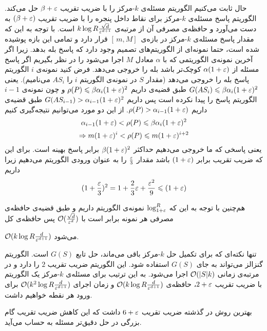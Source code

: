 حال ثابت می‌کنیم الگوریتم  مسئله‌ی $k$-مرکز را با ضریب تقریب $ \beta + \varepsilon$ حل می‌کند.
الگوریتم   پاسخ مسئله‌ی $k$-مرکز برای نقاط داخل پنجره را با ضریب تقریب $(\beta+\varepsilon)$ به دست می‌آورد و حافظه‌ی مصرفی آن از مرتبه‌ی 
$ k \log R \frac{\sqrt{d}}{\varepsilon^{d+1}}$
است.
با توجه به این که مقدار پاسخ مسئله‌ی $k$-مرکز در بازه‌ی $ [\, m, M]\,$ قرار دارد و تمامی این بازه پوشیده شده است، حتما نمونه‌ای از الگوریتم‌های تصمیم وجود دارد که پاسخ بله بدهد. زیرا اگر آخرین نمونه‌ی الگوریتمی که با $\alpha$ معادل $M$ اجرا می‌شود را در نظر بگیریم اگر پاسخ مسئله از 
$\alpha (1 +\varepsilon)$
کوچک‌تر باشد بله را خروجی می‌دهد. فرض کنید نمونه‌ی $i$ الگوریتم پاسخ بله را خروجی می‌دهد (مقدار $S$ در نمونه‌ی الگوریتم $i$ را $AS_i$ می‌نامیم). یعنی
$ G(AS_i) \leqslant \beta \alpha_i (1 + \varepsilon) ^ 2 $
طبق قضیه‌ی  داریم
$ \rho(P) \leqslant \beta \alpha_i (1 + \varepsilon) ^ 2 $
و چون نمونه‌ی $i-1$ الگوریتم  پاسخ را پیدا نکرده است پس داریم
$ G(AS_{i-1}) > \alpha_{i-1} (1+\varepsilon)^2$
طبق قضیه‌ی  داریم
$ \rho(P) >  \alpha_{i-1} (1 + \varepsilon) $.
از این دو مورد می‌توانیم نتیجه‌گیری کنیم
$$   \alpha_{i-1} (1 + \varepsilon) < \rho(P) \leqslant  \beta \alpha_i (1 + \varepsilon) ^ 2  $$
$$ \Rightarrow m (1+\varepsilon)^i < \rho(P) \leqslant m (1+\varepsilon)^{i+2} $$
یعنی پاسخی که ما خروجی می‌دهیم حداکثر 
$\beta (1 + \varepsilon)^2$
برابر پاسخ بهینه است. برای این که ضریب تقریب برابر $(1+\varepsilon)$ باشد مقدار $\frac{\varepsilon}{3}$ را به عنوان ورودی الگوریتم می‌دهیم زیرا داریم
$$ (1+\frac{\varepsilon}{3})^2 = 1 + \frac{2}{3} \varepsilon + \frac{\varepsilon^2}{9} \leqslant (1+\varepsilon)$$

هم‌چنین با توجه به این که $\log_{1+\varepsilon}^{R} $ نمونه‌ی الگوریتم داریم و طبق قضیه‌ی  حافظه‌ی مصرفی هر نمونه برابر است با 
$\mathcal{O}(\frac{\sqrt{d}}{\varepsilon^d})$
پس حافظه‌ی کل

$ \mathcal{O}(k \log R \frac{d}{\varepsilon^{d+1}})$
می‌شود.

تنها نکته‌ای که برای تکمیل حل $k$-مرکز باقی می‌ماند، حل تابع $G(S)$ است. الگوریتم گنزالز می‌تواند به جای $G(S)$ استفاده شود. این الگوریتم ضریب تقریب $2$ را دارد و در مرتبه‌ی زمانی $\mathcal{O}(|S| k)$ اجرا می‌شود. به این ترتیب برای مسئله‌ی $k$-مرکز یک الگوریتم با ضریب تقریب $2+\varepsilon$، حافظه‌ی
$ \mathcal{O}(k \log R \frac{d}{\varepsilon^{d+1}})$
و زمان اجرای
$ \mathcal{O}(k^2 \log R \frac{d}{\varepsilon^{d+1}})$
برای ورود هر نقطه خواهیم داشت.

بهترین روش در گذشته ضریب تقریب $6+\varepsilon$ داشت  که این کاهش ضریب تقریب گام بزرگی در حل دقیق‌تر مسئله به حساب می‌آید.
